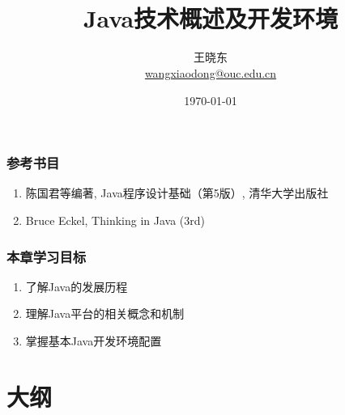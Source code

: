 
\title[Wang Xiaodong]{\\  
  Java技术概述及开发环境}
\author[王晓东]{王晓东\\
  \href{mailto:wangxiaodong@ouc.edu.cn}{\footnotesize wangxiaodong@ouc.edu.cn}}
\date{\today}


 \frame{\titlepage}

\begin{frame}
\frametitle{参考书目}
\begin{enumerate}
\item 陈国君等编著, Java程序设计基础（第5版）, 清华大学出版社
\item Bruce Eckel, Thinking in Java (3rd)
\end{enumerate}  
\end{frame}

\begin{frame}
\frametitle{本章学习目标}
\begin{enumerate}
\item 了解Java的发展历程
\item 理解Java平台的相关概念和机制
\item 掌握基本Java开发环境配置
\end{enumerate}  
\end{frame}

\section*{大纲}

